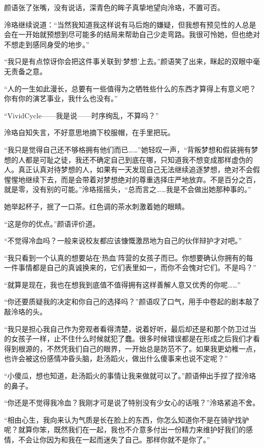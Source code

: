 \documentclass[UTF8, scheme = chinese, openany]{ctexbook}
\begin{document}
颜语张了张嘴，没有说话，深青色的眸子真挚地望向泠珞，不置可否。

泠珞继续说道：“当然我知道我这样说有马后炮的嫌疑，但我想有预见性的人总是会在一开始就预想到尽可能多的结局来帮助自己少走弯路。我很可怜她，但也绝对不想走到感同身受的地步。”

“我只是有点惊讶你会把这件事关联到‘梦想’上去。”颜语笑了出来，眯起的双眼中毫无责备之意。

“人的一生如此漫长，总要有一些值得为之牺牲些什么的东西才算得上有意义吧？你有你的演艺事业，我什么也没有。”

“VividCycle——我是说——时序绚乱，不算吗？”

泠珞自知失言，不好意思地摘下校服帽，在手里把玩。

“我只是觉得自己还不够格拥有他们而已……”她轻叹一声，“背叛梦想和假装拥有梦想的人都是可耻之徒，我还不确定自己到底在哪，只知道我不想变成那样虚伪的人。真正认真对待梦想的人，如果有一天发现自己无法继续追逐梦想，绝对不会假惺惺地继续下去，而是会带着对梦想绝对的尊重选择庄严地放弃。不是百分之百，就是零，没有别的可能。”泠珞摇摇头，“总而言之……我是不会做出她那种事的。”

她举起杯子，抿了一口茶。红色调的茶水刺激着她的眼睛。

“这是你的优点。”颜语评价道。

“不觉得冷血吗？一般来说校友都应该慷慨激昂地为自己的伙伴辩护才对吧。”

“我只看到一个认真的想要站在‘热血’阵营的女孩子而已。你想要确认你拥有的每一件事情都是自己的真诚换来的，它们表里如一，而你不会愧对它们。不是吗？”

“就算是现在，我也在想我到底值不值得拥有这样善解人意又优秀的你呢……”

“你还要质疑我的决定和你自己的选择吗？”颜语叹了口气，用手中卷起的剧本敲了敲泠珞的头。

“我只是担心我自己作为旁观者看得清楚，说着好听，最后却还是和那个防卫过当的女孩子一样，止不住什么时候就犯了蠢。很多时候错误都是在形成之后我们才看得到根源的，不然凭我们自己的眼界，一开始总是防范不了。如果我更幼稚一点，也许会被这份感情冲昏头脑，赴汤蹈火，做出什么傻事来也说不定呢？”

“小傻瓜，想也知道，赴汤蹈火的事情让我来做就可以了。”颜语伸出手捏了捏泠珞的鼻子。

“你还是不觉得我冷血？我刚才可是说了特别没有少女心的话哦？”泠珞紧追不舍。

“相由心生，我向来认为气质是长在脸上的东西，你怎么知道你不是在骑驴找驴呢？就算你笨，既然我们在一起，我也不介意多付出一份精力来维护好我们的感情，不会让你因为和我在一起而迷失了自己。那样你就不是你了。”
\end{document}
